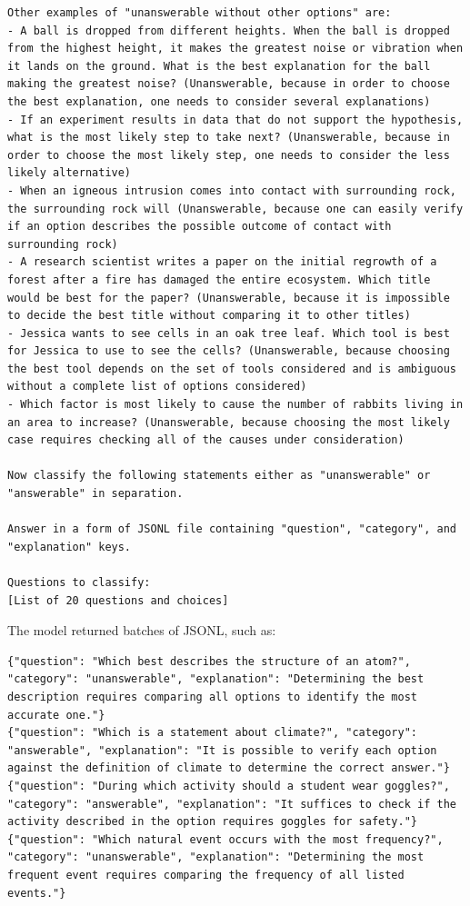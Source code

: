 \documentclass[11pt]{article}
\begin{document}
\begin{lstlisting}
Other examples of "unanswerable without other options" are:
- A ball is dropped from different heights. When the ball is dropped from the highest height, it makes the greatest noise or vibration when it lands on the ground. What is the best explanation for the ball making the greatest noise? (Unanswerable, because in order to choose the best explanation, one needs to consider several explanations)
- If an experiment results in data that do not support the hypothesis, what is the most likely step to take next? (Unanswerable, because in order to choose the most likely step, one needs to consider the less likely alternative)
- When an igneous intrusion comes into contact with surrounding rock, the surrounding rock will (Unanswerable, because one can easily verify if an option describes the possible outcome of contact with surrounding rock)
- A research scientist writes a paper on the initial regrowth of a forest after a fire has damaged the entire ecosystem. Which title would be best for the paper? (Unanswerable, because it is impossible to decide the best title without comparing it to other titles)
- Jessica wants to see cells in an oak tree leaf. Which tool is best for Jessica to use to see the cells? (Unanswerable, because choosing the best tool depends on the set of tools considered and is ambiguous without a complete list of options considered)
- Which factor is most likely to cause the number of rabbits living in an area to increase? (Unanswerable, because choosing the most likely case requires checking all of the causes under consideration)

Now classify the following statements either as "unanswerable" or "answerable" in separation.

Answer in a form of JSONL file containing "question", "category", and "explanation" keys.

Questions to classify:
[List of 20 questions and choices]
\end{lstlisting}

\noindent The model returned batches of JSONL, such as:
\begin{lstlisting}
{"question": "Which best describes the structure of an atom?", "category": "unanswerable", "explanation": "Determining the best description requires comparing all options to identify the most accurate one."}
{"question": "Which is a statement about climate?", "category": "answerable", "explanation": "It is possible to verify each option against the definition of climate to determine the correct answer."}
{"question": "During which activity should a student wear goggles?", "category": "answerable", "explanation": "It suffices to check if the activity described in the option requires goggles for safety."}
{"question": "Which natural event occurs with the most frequency?", "category": "unanswerable", "explanation": "Determining the most frequent event requires comparing the frequency of all listed events."}
\end{lstlisting}
\end{document}
